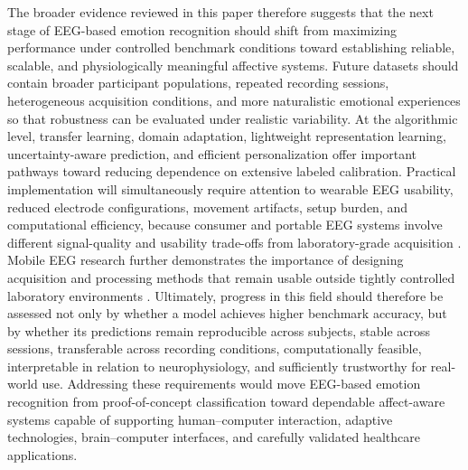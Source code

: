 \documentclass{WileyMSP-template}
\begin{document}
The broader evidence reviewed in this paper therefore suggests that the next stage of EEG-based emotion recognition should shift from maximizing performance under controlled benchmark conditions toward establishing reliable, scalable, and physiologically meaningful affective systems. Future datasets should contain broader participant populations, repeated recording sessions, heterogeneous acquisition conditions, and more naturalistic emotional experiences so that robustness can be evaluated under realistic variability. At the algorithmic level, transfer learning, domain adaptation, lightweight representation learning, uncertainty-aware prediction, and efficient personalization offer important pathways toward reducing dependence on extensive labeled calibration. Practical implementation will simultaneously require attention to wearable EEG usability, reduced electrode configurations, movement artifacts, setup burden, and computational efficiency, because consumer and portable EEG systems involve different signal-quality and usability trade-offs from laboratory-grade acquisition \cite{dadebayev2022commercial,casson2010wearable}. Mobile EEG research further demonstrates the importance of designing acquisition and processing methods that remain usable outside tightly controlled laboratory environments \cite{debener2012mobile}. Ultimately, progress in this field should therefore be assessed not only by whether a model achieves higher benchmark accuracy, but by whether its predictions remain reproducible across subjects, stable across sessions, transferable across recording conditions, computationally feasible, interpretable in relation to neurophysiology, and sufficiently trustworthy for real-world use. Addressing these requirements would move EEG-based emotion recognition from proof-of-concept classification toward dependable affect-aware systems capable of supporting human--computer interaction, adaptive technologies, brain--computer interfaces, and carefully validated healthcare applications.




\end{document}

